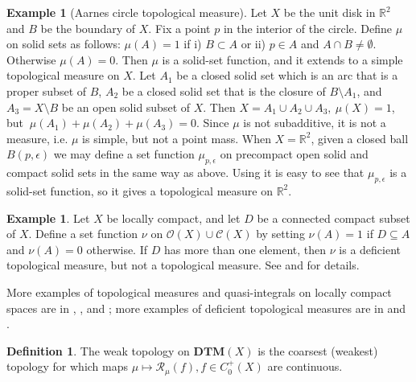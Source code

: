 \documentclass[sn-mathphys-num]{sn-jnl}%
\theoremstyle{thmstyleone}%
\theoremstyle{definition}
\newtheorem{definition}[theorem]{Definition}
\newtheorem{example}[theorem]{Example}
\begin{document}
\begin{example}[Aarnes circle topological measure] \label{Aatm}
Let $X$ be the unit disk in $ \mathbb{R}^2$ and $B$ be the boundary of $X.$
Fix a point $p$ in the interior of the circle.
Define $\mu $ on solid sets as follows:
$\mu (A) = 1$ if i) $B \subset A$ or
ii) $ p \in A $ and $A \cap B \ne  \emptyset$.
Otherwise $ \mu(A) = 0 $.
Then $ \mu $ is a solid-set function, and it extends to a simple topological measure on $X$.
Let $A_1$ be a closed solid set which is an arc that is a proper subset of $B$, 
$A_2$ be a closed solid set that is the closure of $B \setminus A_1$, 
and $A_3 = X \setminus B$ be
an open solid subset of $X$. Then 
$X =  A_1 \cup A_2 \cup A_3, \  \mu(X) = 1 $, but 
$ \  \mu (A_1) + \mu(A_2) + \mu(A_3) = 0$.
Since $ \mu$ is not subadditive,  it is not a measure, i.e. $\mu$ is simple, but not a point mass. 
When $X = \mathbb{R}^2$, given a closed ball $B(p, \epsilon)$ we may define a set function $\mu_{p, \epsilon}$ 
on precompact open solid and compact solid sets in 
the same way as above. Using \cite[Def. 6.1, Th. 3.10]{Butler:TMLCconstr} it is easy to see that  $\mu_{p, \epsilon}$ is a solid-set function, 
so it gives a topological 
measure on $\mathbb{R}^2$. 
\end{example}

\begin{example} \label{basicExDTM}
Let $X$ be locally compact, and let $D$ be a connected compact subset of $X$. Define a set function 
$\nu$ on $\mathscr{O}(X) \cup \mathscr{C}(X)$  by setting $\nu(A) = 1$ if $ D \subseteq A$ and $\nu(A) = 0$ otherwise.
If $D$ has more than one element, then $\nu$ is a deficient topological measure, but not 
a topological measure. See \cite[Ex. 6.1]{Butler:DTMLC} and \cite[Ex. 1, p.729]{Svistula:DTM} for details.
\end{example}

\noindent
More examples of topological measures and quasi-integrals on locally compact spaces
are in \cite{Butler:TechniqLC}, \cite{Butler:QLFLC}, and \cite[Sect. 15]{Butler:TMLCconstr};
more examples of deficient topological measures are in  \cite{Butler:DTMLC} and \cite{Svistula:DTM}. 

\begin{definition} \label{defwk}
The weak topology on $ \mathbf{DTM}(X)$ is the coarsest (weakest) topology for which maps 
$ \mu \longmapsto \mathcal{R}_{\mu} (f), f \in C_0^+(X) $ are continuous.
\end{definition}
\end{document}
